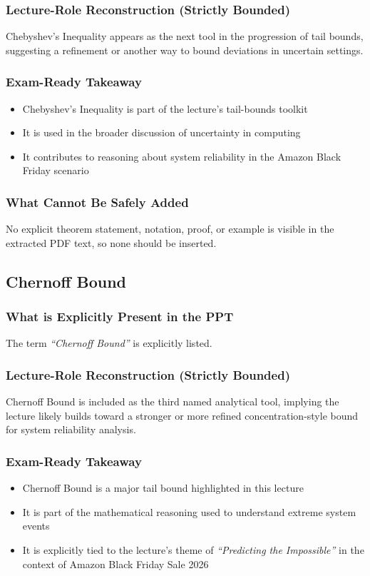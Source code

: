 \documentclass[11pt]{article}
\begin{document}
\subsubsection*{Lecture-Role Reconstruction (Strictly Bounded)}
Chebyshev's Inequality appears as the next tool in the progression of tail bounds, suggesting a refinement or another way to bound deviations in uncertain settings.

\subsubsection*{Exam-Ready Takeaway}
\begin{itemize}
    \item Chebyshev's Inequality is part of the lecture's tail-bounds toolkit
    \item It is used in the broader discussion of uncertainty in computing
    \item It contributes to reasoning about system reliability in the Amazon Black Friday scenario
\end{itemize}

\subsubsection*{What Cannot Be Safely Added}
No explicit theorem statement, notation, proof, or example is visible in the extracted PDF text, so none should be inserted.

\subsection{Chernoff Bound}

\subsubsection*{What is Explicitly Present in the PPT}
The term \textit{``Chernoff Bound''} is explicitly listed.

\subsubsection*{Lecture-Role Reconstruction (Strictly Bounded)}
Chernoff Bound is included as the third named analytical tool, implying the lecture likely builds toward a stronger or more refined concentration-style bound for system reliability analysis.

\subsubsection*{Exam-Ready Takeaway}
\begin{itemize}
    \item Chernoff Bound is a major tail bound highlighted in this lecture
    \item It is part of the mathematical reasoning used to understand extreme system events
    \item It is explicitly tied to the lecture's theme of \textit{``Predicting the Impossible''} in the context of Amazon Black Friday Sale 2026
\end{itemize}
\end{document}
